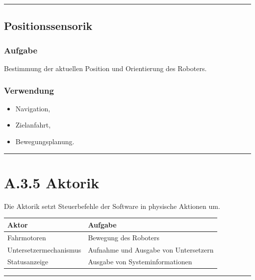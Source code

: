 \documentclass[
  a4paper,
  12pt,
  DIV=12,        %
  parskip=half,  %
  headings=small %
]{scrartcl}
\theoremstyle{definition}
\providecommand{\tightlist}{%
  \setlength{\itemsep}{0pt}\setlength{\parskip}{0pt}}
\theoremstyle{definition}
\providecommand{\tightlist}{%
  \setlength{\itemsep}{0pt}\setlength{\parskip}{0pt}}
\begin{document}
\begin{center}\rule{0.5\linewidth}{0.5pt}\end{center}

\subsection{Positionssensorik}\label{positionssensorik-1}

\subsubsection{Aufgabe}\label{aufgabe-5}

Bestimmung der aktuellen Position und Orientierung des Roboters.

\subsubsection{Verwendung}\label{verwendung-2}

\begin{itemize}
\tightlist
\item
  Navigation,
\item
  Zielanfahrt,
\item
  Bewegungsplanung.
\end{itemize}

\begin{center}\rule{0.5\linewidth}{0.5pt}\end{center}

\section{A.3.5 Aktorik}\label{a.3.5-aktorik}

Die Aktorik setzt Steuerbefehle der Software in physische Aktionen um.

\begin{longtable}[]{@{}ll@{}}
\toprule\noalign{}
Aktor & Aufgabe \\
\midrule\noalign{}
\endhead
\bottomrule\noalign{}
\endlastfoot
Fahrmotoren & Bewegung des Roboters \\
Untersetzermechanismus & Aufnahme und Ausgabe von Untersetzern \\
Statusanzeige & Ausgabe von Systeminformationen \\
\end{longtable}

\begin{center}\rule{0.5\linewidth}{0.5pt}\end{center}
\end{document}
